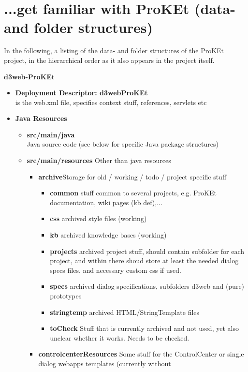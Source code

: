 \documentclass[a4paper,10pt]{scrreprt}
\begin{document}
\section{...get familiar with ProKEt (data- and folder structures)}
In the following, a listing of the data- and folder structures of the ProKEt project, in the hierarchical order as it 
also appears in the project itself.\\\par

\begin{footnotesize}
\textbf{d3web-ProKEt}
\begin{itemize}
	\item \textbf{Deployment Descriptor: d3webProKEt}\\
	is the web.xml file, specifies context stuff, references, servlets etc
	\item \textbf{Java Resources}
	\begin{itemize}
		\item \textbf{src/main/java} \\
		Java source code (see below for specific Java package structures)
		\item \textbf{src/main/resources} Other than java resources
		\begin{itemize}
			\item \textbf{archive}Storage for old / working / todo / project specific stuff
			\begin{itemize}
				\item \textbf{common} stuff common to several projects, e.g. ProKEt documentation, wiki pages (kb def),...
				\item \textbf{css} archived style files (working)
				\item \textbf{kb} archived knowledge bases (working)
				\item \textbf{projects} archived project stuff, should contain subfolder for each project, and within there shoud store at least the needed dialog specs files, and necessary custom css if used.
				\item \textbf{specs} archived dialog specifications, subfolders d3web and (pure) prototypes
				\item \textbf{stringtemp} archived HTML/StringTemplate files
				\item \textbf{toCheck} Stuff that is currently archived and not used, yet also unclear whether it works. Needs to be checked.
			\end{itemize}	
			\item \textbf{controlcenterResources} Some stuff for the ControlCenter or single dialog webapps templates (currently without 

\end{itemize}
\end{itemize}
\end{itemize}
\end{footnotesize}
\end{document}
